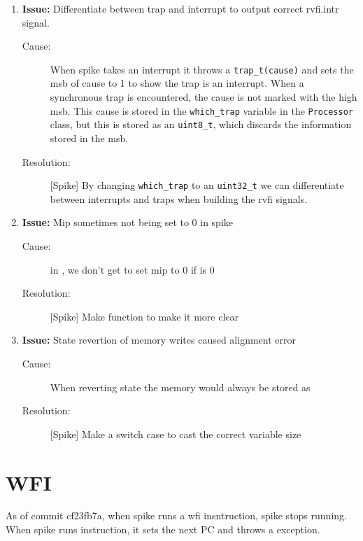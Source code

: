 \begin{enumerate}
\item \textbf{Issue:} Differentiate between trap and interrupt to output correct rvfi.intr signal.
  \begin{description}
    \item[Cause:] When spike takes an interrupt it throws a \lstinline{trap_t(cause)} and sets the msb of cause to 1 to show the trap is an interrupt. When a synchronous trap is encountered, the cause is not marked with the high msb. This cause is stored in the \lstinline{which_trap} variable in the \lstinline{Processor} class, but this is stored as an \lstinline{uint8_t}, which discards the information stored in the msb.
    \item[Resolution:] [Spike] By changing \lstinline{which_trap} to an \lstinline{uint32_t} we can differentiate between interrupts and traps when building the rvfi signals.
  \end{description}

\item \textbf{Issue:} Mip sometimes not being set to 0 in spike
  \begin{description}
    \item[Cause:] in , we don't get to set mip to 0 if  is 0
    \item[Resolution:] [Spike] Make  function to make it more clear
  \end{description}

\item \textbf{Issue:} State revertion of memory writes caused alignment error
  \begin{description}
    \item[Cause:] When reverting state the memory would always be stored as 
    \item[Resolution:] [Spike] Make a switch case to cast the correct variable size 
  \end{description}

  
\end{enumerate}

\section{WFI}

As of commit cf23fb7a, when spike runs a wfi insntruction, spike stops running.
When spike runs  instruction, it sets the next PC and throws a  exception.

